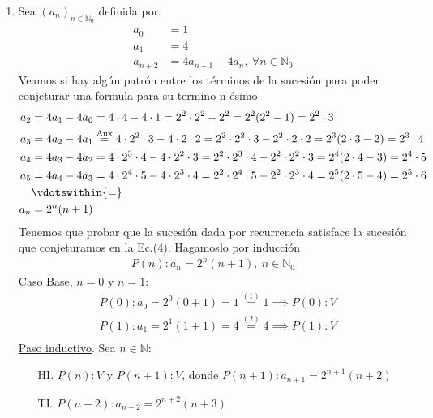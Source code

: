 \begin{enumerate}[label=\roman*)]
  \item Sea $(a_n)_{n \in \mathbb{N}_0}$ definida por
    \setcounter{equation}{0}
    \begin{align}
        a_0 &= 1 \\
        a_1 &= 4 \\
        a_{n+2} &= 4 a_{n+1} - 4 a_n,\ \forall n \in \mathbb{N}_0 
    \end{align}
    Veamos si hay algún patrón entre los términos de la sucesión para poder conjeturar una formula para su termino 
    n-ésimo
    \begin{align}
        a_2 &= 4a_1 - 4a_0 = 4 \cdot 4 - 4 \cdot 1 = 2^2 \cdot 2^2 - 2^2 = 2^2(2^2 - 1) = 2^2 \cdot 3 \nonumber \\
        a_3 &= 4a_2 - 4a_1 \overset{\text{Aux}}{=} 4\cdot 2^2 \cdot 3 - 4 \cdot 2 \cdot 2 =
        2^2\cdot 2^2 \cdot 3 - 2^2 \cdot 2 \cdot 2 = 2^3 (2 \cdot 3 - 2) = 2^3 \cdot 4 \nonumber \\
        a_4 &= 4a_3 - 4a_2 = 4 \cdot 2^3 \cdot 4 - 4 \cdot 2^2 \cdot 3 = 2^2 \cdot 2^3 \cdot 4 - 2^2 \cdot 2^2 \cdot 3 
        = 2^4 (2 \cdot 4 - 3) = 2^4 \cdot 5  \nonumber \\
        a_5 &= 4a_4 - 4a_3 = 4 \cdot 2^4 \cdot 5 - 4 \cdot 2^3 \cdot 4 = 2^2 \cdot 2^4 \cdot 5 - 2^2 \cdot 2^3 \cdot 4 
        = 2^5(2 \cdot 5 - 4) = 2^5 \cdot 6 \nonumber \\
        &\vdotswithin{=} \nonumber \\
        a_n &= 2^n (n+1)
    \end{align}
    Tenemos que probar que la sucesión dada por recurrencia satisface la sucesión que conjeturamos en la Ec.(4). 
    Hagamoslo por inducción
    \begin{align*}
        P(n): a_n = 2^n (n+1), \ n \in \mathbb{N}_0   
    \end{align*}
    \underline{Caso Base}, $n = 0$ y $n = 1$:
  \begin{align*}
    &P(0): a_0 = 2^0 (0+1) = 1 \overset{(1)}{=} 1 \implies P(0):V \\
        &P(1): a_1 = 2^1 (1+1) = 4 \overset{(2)}{=} 4 \implies P(1):V \\
  \end{align*}
  \underline{Paso inductivo}. Sea $n \in \mathbb{N}$:
  \begin{enumerate}
        \item[HI.] $P(n):V \text{ y } P(n+1):V$, donde $P(n+1): a_{n+1} = 2^{n+1}(n+2)$
        \item[TI.] $P(n+2): a_{n+2} = 2^{n+2}(n+3)$

\end{enumerate}
\end{enumerate}
